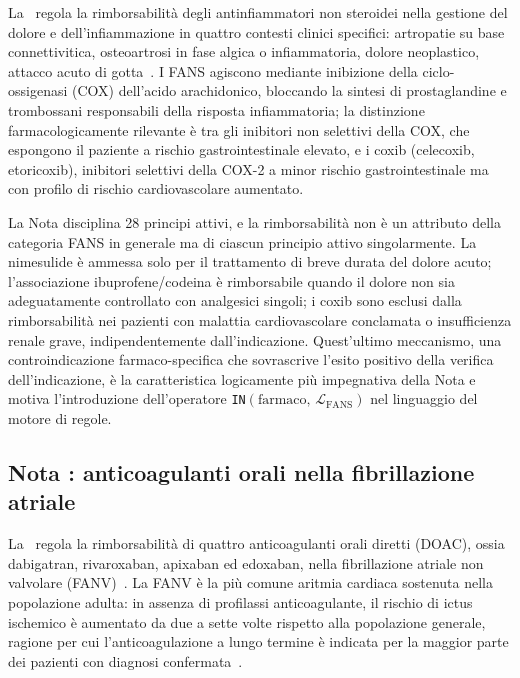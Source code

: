 La \notesessanta\ regola la rimborsabilità degli antinfiammatori non steroidei
nella gestione del dolore e dell'infiammazione in quattro contesti
clinici specifici: artropatie su base connettivitica, osteoartrosi in fase
algica o infiammatoria, dolore neoplastico, attacco acuto di gotta~\cite{nota66aifa}.
I FANS agiscono mediante inibizione della ciclo-ossigenasi (COX) dell'acido
arachidonico, bloccando la sintesi di prostaglandine e trombossani responsabili
della risposta infiammatoria; la distinzione farmacologicamente rilevante è
tra gli inibitori non selettivi della COX, che espongono il paziente a rischio
gastrointestinale elevato, e i coxib (celecoxib, etoricoxib), inibitori
selettivi della COX-2 a minor rischio gastrointestinale ma con profilo di
rischio cardiovascolare aumentato.

La Nota disciplina 28 principi attivi, e la rimborsabilità non è un attributo
della categoria FANS in generale ma di ciascun principio attivo singolarmente.
La nimesulide è ammessa solo per il trattamento di breve durata del dolore
acuto; l'associazione ibuprofene/codeina è rimborsabile quando il dolore non
sia adeguatamente controllato con analgesici singoli; i coxib sono esclusi
dalla rimborsabilità nei pazienti con malattia cardiovascolare conclamata o
insufficienza renale grave, indipendentemente dall'indicazione.
Quest'ultimo meccanismo, una controindicazione farmaco-specifica che sovrascrive
l'esito positivo della verifica dell'indicazione, è la caratteristica logicamente
più impegnativa della Nota e motiva l'introduzione dell'operatore
\texttt{IN}$(\text{farmaco},\,\mathcal{L}_\text{FANS})$ nel linguaggio
del motore di regole.

\subsection{Nota \notenova: anticoagulanti orali nella fibrillazione atriale}
\label{subsec:nota97}

La \notenova\ regola la rimborsabilità di quattro anticoagulanti orali diretti
(DOAC), ossia dabigatran, rivaroxaban, apixaban ed edoxaban, nella fibrillazione
atriale non valvolare (FANV)~\cite{aifa2018nota97}.
La FANV è la più comune aritmia cardiaca sostenuta nella popolazione adulta: in
assenza di profilassi anticoagulante, il rischio di ictus ischemico è aumentato
da due a sette volte rispetto alla popolazione generale, ragione per cui
l'anticoagulazione a lungo termine è indicata per la maggior parte dei pazienti
con diagnosi confermata~\cite{esc2020afib}.

